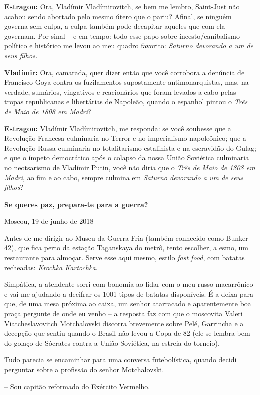 \textbf{Estragon:} Ora, Vladímir Vladímirovitch, se bem me lembro,
Saint-Just não acabou sendo abortado pelo mesmo útero que o pariu?
Afinal, se ninguém governa sem culpa, a culpa também pode decapitar
aqueles que com ela governam. Por sinal -- e em tempo: todo esse papo
sobre incesto/canibalismo político e histórico me levou ao meu quadro
favorito: \emph{Saturno devorando a um de seus filhos.}

\textbf{Vladímir:} Ora, camarada, quer dizer então que você corrobora a
denúncia de Francisco Goya contra os fuzilamentos supostamente
antimonarquistas, mas, na verdade, sumários, vingativos e reacionários
que foram levados a cabo pelas tropas republicanas e libertárias de
Napoleão, quando o espanhol pintou o \emph{Três de Maio de 1808 em
Madri}?

\textbf{Estragon:} Vladímir Vladímirovitch, me responda: se você
soubesse que a Revolução Francesa culminaria no Terror e no imperialismo
napoleônico; que a Revolução Russa culminaria no totalitarismo
estalinista e na escravidão do Gulag; e que o ímpeto democrático após o
colapso da nossa União Soviética culminaria no neotsarismo de Vladímir
Putin, você não diria que o \emph{Três de Maio de 1808 em Madri}, ao fim
e ao cabo, sempre culmina em \emph{Saturno devorando a um de seus
filhos}?

\textbf{Se queres paz, prepara-te para a guerra?}

Moscou, 19 de junho de 2018

Antes de me dirigir ao Museu da Guerra Fria (também conhecido como
Bunker 42), que fica perto da estação Taganskaya do metrô, tento
escolher, a esmo, um restaurante para almoçar. Serve esse aqui mesmo,
estilo \emph{fast food}, com batatas recheadas: \emph{Krochka
Kartochka}.

Simpática, a atendente sorri com bonomia ao lidar com o meu russo
macarrônico e vai me ajudando a decifrar os 1001 tipos de batatas
disponíveis. É a deixa para que, de uma mesa próxima ao caixa, um senhor
atarracado e aparentemente boa praça pergunte de onde eu venho -- a
resposta faz com que o moscovita Valeri Viatcheslavovitch Motchalovski
discorra brevemente sobre Pelé, Garrincha e a decepção que sentiu quando
o Brasil não levou a Copa de 82 (ele se lembra bem do golaço de Sócrates
contra a União Soviética, na estreia do torneio).

Tudo parecia se encaminhar para uma conversa futebolística, quando
decidi perguntar sobre a profissão do senhor Motchalovski.

-- Sou capitão reformado do Exército Vermelho.

